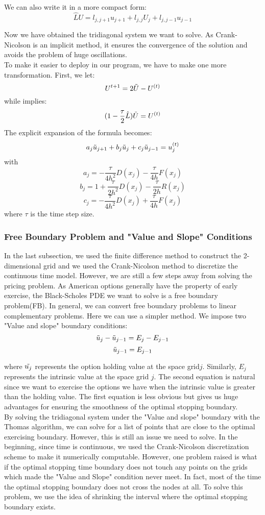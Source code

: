 \documentclass{article}
\begin{document}
We can also write it in a more compact form:
$$\hat{L}U = l_{j,j+1}u_{j+1} + l_{j,j}U_{j} +l_{j,j-1}u_{j-1}$$

Now we have obtained the tridiagonal system we want to solve. As Crank-Nicolson is an implicit method, it ensures the convergence of the solution and avoids the problem of huge oscillations. \\

To make it easier to deploy in our program, we have to make one more transformation. First, we let:
$$U^{t+1} = 2\Tilde{U} - U^{(t)}$$
while implies:
$$(1-\frac{\tau}{2} \hat L)\Tilde{U} = U^{(t)}$$
The explicit expansion of the formula becomes:
$$a_j\Tilde{u}_{j+1} + b_j\Tilde{u}_{j} + c_j\Tilde{u}_{j-1} = u^{(t)}_j$$
with
$$a_j = -\frac{\tau}{4h^2}D(x_j) - \frac{\tau}{4h}F(x_j)$$
$$b_j = 1 + \frac{\tau}{2h^2}D(x_j) - \frac{\tau}{2h}R(x_j)$$
$$c_j = - \frac{\tau}{4h^2}D(x_j) + \frac{\tau}{4h}F(x_j)$$
where $\tau$ is the time step size.
\subsubsection{Free Boundary Problem and "Value and Slope" Conditions}
In the last subsection, we used the finite difference method to construct the 2-dimensional grid and we used the Crank-Nicolson method to discretize the continuous time model. However, we are still a few steps away from solving the pricing problem. As American options generally have the property of early exercise, the Black-Scholes PDE we want to solve is a free boundary problem(FB). In general, we can convert free boundary problems to linear complementary problems. Here we can use a simpler method. We impose two "Value and slope" boundary conditions: $$\Tilde{u}_j - \Tilde{u}_{j-1} = E_j - E_{j-1}$$ $$\Tilde{u}_{j-1} = E_{j-1}$$

where $\Tilde{u_j}$ represents the option holding value at the space grid$j$. Similarly, $E_j$ represents the intrinsic value at the space grid $j$. The second equation is natural since we want to exercise the options we have when the intrinsic value is greater than the holding value. The first equation is less obvious but gives us huge advantages for ensuring the smoothness of the optimal stopping boundary.\\

By solving the tridiagonal system under the "Value and slope" boundary with the Thomas algorithm, we can solve for a list of points that are close to the optimal exercising boundary. However, this is still an issue we need to solve. In the beginning, since time is continuous, we used the Crank-Nicolson discretization scheme to make it numerically computable. However, one problem raised is what if the optimal stopping time boundary does not touch any points on the grids which made the "Value and Slope" condition never meet. In fact, most of the time the optimal stopping boundary does not cross the nodes at all. To solve this problem, we use the idea of shrinking the interval where the optimal stopping boundary exists. \\
\end{document}
